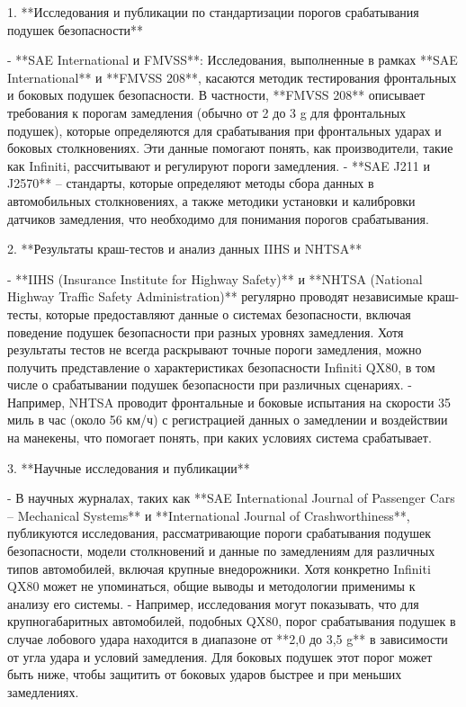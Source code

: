  1. **Исследования и публикации по стандартизации порогов срабатывания подушек безопасности**

- **SAE International и FMVSS**: Исследования, выполненные в рамках **SAE International** и **FMVSS 208**, касаются методик тестирования фронтальных и боковых подушек безопасности. В частности, **FMVSS 208** описывает требования к порогам замедления (обычно от 2 до 3 g для фронтальных подушек), которые определяются для срабатывания при фронтальных ударах и боковых столкновениях. Эти данные помогают понять, как производители, такие как Infiniti, рассчитывают и регулируют пороги замедления.
- **SAE J211 и J2570** – стандарты, которые определяют методы сбора данных в автомобильных столкновениях, а также методики установки и калибровки датчиков замедления, что необходимо для понимания порогов срабатывания.

 2. **Результаты краш-тестов и анализ данных IIHS и NHTSA**

- **IIHS (Insurance Institute for Highway Safety)** и **NHTSA (National Highway Traffic Safety Administration)** регулярно проводят независимые краш-тесты, которые предоставляют данные о системах безопасности, включая поведение подушек безопасности при разных уровнях замедления. Хотя результаты тестов не всегда раскрывают точные пороги замедления, можно получить представление о характеристиках безопасности Infiniti QX80, в том числе о срабатывании подушек безопасности при различных сценариях.
- Например, NHTSA проводит фронтальные и боковые испытания на скорости 35 миль в час (около 56 км/ч) с регистрацией данных о замедлении и воздействии на манекены, что помогает понять, при каких условиях система срабатывает.

 3. **Научные исследования и публикации**

- В научных журналах, таких как **SAE International Journal of Passenger Cars – Mechanical Systems** и **International Journal of Crashworthiness**, публикуются исследования, рассматривающие пороги срабатывания подушек безопасности, модели столкновений и данные по замедлениям для различных типов автомобилей, включая крупные внедорожники. Хотя конкретно Infiniti QX80 может не упоминаться, общие выводы и методологии применимы к анализу его системы.
- Например, исследования могут показывать, что для крупногабаритных автомобилей, подобных QX80, порог срабатывания подушек в случае лобового удара находится в диапазоне от **2,0 до 3,5 g** в зависимости от угла удара и условий замедления. Для боковых подушек этот порог может быть ниже, чтобы защитить от боковых ударов быстрее и при меньших замедлениях.

